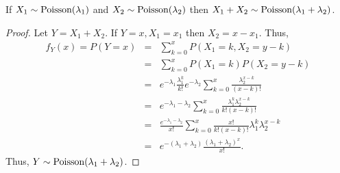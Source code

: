 \documentclass{article}
\begin{document}
\begin{prop}\label{c2p4}
If $X_1 \sim \text{Poisson}(\lambda_1)$ and $X_2 \sim \text{Poisson}(\lambda_2)$ then $X_1 +
X_2 \sim \text{Poisson}(\lambda_1 + \lambda_2)$.
\end{prop}
\begin{proof}
Let $Y = X_1 + X_2$. If $Y = x, X_1 = x_1$ then $X_2 = x - x_1$. Thus,
\begin{eqnarray*}
f_Y(x) = P(Y = x) &=& \sum_{k=0}^xP(X_1 = k, X_2 = y - k) \\
 &=& \sum_{k=0}^xP(X_1=k)P(X_2=y-k) \\
 &=& e^{-\lambda_1}\frac{\lambda_1^{k}}{k!}e^{-\lambda_2}\sum_{k=0}^x
 \frac{\lambda_2^{x - k}}{(x - k)!} \\
 &=& e^{-\lambda_1 - \lambda_2}\sum_{k=0}^x
 \frac{\lambda_1^{k}\lambda_2^{x-k}}{k!(x-k)!} \\
 &=& \frac{e^{-\lambda_1 - \lambda_2}}{x!}\sum_{k=0}^x
 \frac{x!}{k!(x-k)!}\lambda_1^{k}\lambda_2^{x-k} \\
 &=& e^{-(\lambda_1 + \lambda_2)}\frac{(\lambda_1 + \lambda_2)^x}{x!}.
\end{eqnarray*} 
Thus, $Y \sim \text{Poisson}(\lambda_1 + \lambda_2)$.
\end{proof}
\end{document}
